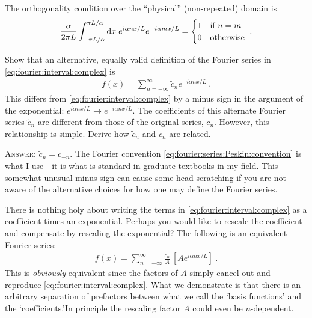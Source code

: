 \documentclass[12pt, oneside]{report}    %
\begin{document}
\noindent
The orthogonality condition over the ``physical'' (non-repeated) domain is 
\begin{align}
    \frac{\alpha}{2\pi L} \int_{-\pi L/\alpha}^{\pi L/\alpha} \operatorname{d}\!{x}\;
    e^{i\alpha n x/L}
    e^{-i\alpha m x/L}
    =
    \begin{cases}
    1 &\textnormal{if } n=m\\
    0 &\textnormal{otherwise} 
    \end{cases}
    \ .
\end{align}


\begin{exercise}\label{ex:Fourier:using:Peskin:exponential:sign:convention}
Show that an alternative, equally valid definition of the Fourier series in \eqref{eq:fourier:interval:complex} is
\begin{align}
    f(x) = \sum_{n=-\infty}^\infty \tilde c_n e^{-i\alpha n x/L} \ .
    \label{eq:fourier:series:Peskin:convention}
\end{align}
This differs from \eqref{eq:fourier:interval:complex} by a minus sign in the argument of the exponential: $e^{i\alpha nx/L} \to e^{-i\alpha nx/L}$. The coefficients of this alternate Fourier series $\tilde c_n$ are different from those of the original series, $c_n$. However, this relationship is simple. Derive how $\tilde c_n$ and $c_n$ are related.

\textsc{Answer}: $\tilde c_n = c_{-n}$. The Fourier convention \eqref{eq:fourier:series:Peskin:convention} is what I use---it is what is standard in graduate textbooks in my field. This somewhat unusual minus sign can cause some head scratching if you are not aware of the alternative choices for how one may define the Fourier series.
\end{exercise}


\begin{example}\label{ex:Fourier:prefactor:convention}
There is nothing holy about writing the terms in \eqref{eq:fourier:interval:complex} as a coefficient times an exponential. Perhaps you would like to rescale the coefficient and compensate by rescaling the exponential? The following is an equivalent Fourier series:
\begin{align}
    f(x) = \sum_{n=-\infty}^\infty 
    \frac{c_n}{A} \, \left[A e^{i\alpha n x/L} \right] \ .
\end{align}
This is \emph{obviously} equivalent since the factors of $A$ simply cancel out and reproduce \eqref{eq:fourier:interval:complex}. What we demonstrate is that there is an arbitrary separation of prefactors between what we call the `basis functions' and the `coefficients.'\sidenotemark  In principle the rescaling factor $A$ could even be $n$-dependent. 
\end{example}
\end{document}
